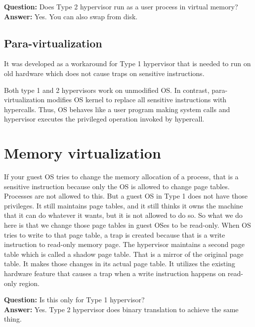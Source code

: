 \documentclass[twoside]{article}
\newcommand{\que}[1]{\textbf{Question:} #1\\}
\newcommand{\ans}[1]{\textbf{Answer:} #1\\}
\begin{document}
\que{Does Type 2 hypervisor run as a user process in virtual memory?}
\ans{Yes. You can also swap from disk.}

\subsection{Para-virtualization}

It was developed as a workaround for Type 1 hypervisor that is needed to run on old hardware which does not cause traps on sensitive instructions.

Both type 1 and 2 hypervisors work on unmodified OS. In contrast, para-virtualization modifies OS kernel to replace all sensitive instructions with hypercalls. Thus, OS behaves like a user program making system calls and hypervisor executes the privileged operation invoked by hypercall.

\section{Memory virtualization}

If your guest OS tries to change the memory allocation of a process, that is a sensitive instruction because only the OS is allowed to change page tables. Processes are not allowed to this. But a guest OS in Type 1 does not have those privileges. It still maintains page tables, and it still thinks it owns the machine that it can do whatever it wants, but it is not allowed to do so. So what we do here is that we change those page tables in guest OSes to be read-only. When OS tries to write to that page table, a trap is created because that is a write instruction to read-only memory page. The hypervisor maintains a second page table which is called a shadow page table. That is a mirror of the original page table. It makes those changes in its actual page table. It utilizes the existing hardware feature that causes a trap when a write instruction happens on read-only region.

\que{Is this only for Type 1 hypervisor?}
\ans{Yes. Type 2 hypervisor does binary translation to achieve the same thing.}
\end{document}
